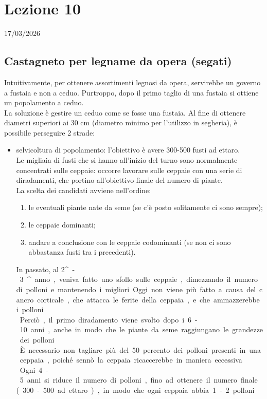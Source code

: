 \section{Lezione 10} \hfill 17/03/2026
\subsection{Castagneto per legname da opera (segati)}
Intuitivamente, per ottenere assortimenti legnosi da opera, servirebbe un governo a fustaia e non a ceduo. Purtroppo, dopo il primo taglio di una fustaia si ottiene un popolamento a ceduo.\\
La soluzione è gestire un ceduo come se fosse una fustaia. Al fine di ottenere diametri superiori ai 30 \unit{cm} (diametro minimo per l'utilizzo in segheria), è possibile perseguire 2 strade:
\begin{itemize}[nosep]
    \item selvicoltura di popolamento: l'obiettivo è avere 300-500 fusti ad ettaro.\\
    Le migliaia di fusti che si hanno all'inizio del turno sono normalmente concentrati sulle ceppaie: occorre lavorare sulle ceppaie con una serie di diradamenti, che portino all'obiettivo finale del numero di piante.\\
    La scelta dei candidati avviene nell'ordine:
    \begin{enumerate}[nosep]
        \item le eventuali piante nate da seme (se c'è posto solitamente ci sono sempre);
        \item le ceppaie dominanti;
        \item andare a conclusione con le ceppaie codominanti (se non ci sono abbastanza fusti tra i precedenti).
    \end{enumerate}
    In passato, al 2\unit{^\circ}-3\unit{^\circ} anno, veniva fatto uno sfollo sulle ceppaie, dimezzando il numero di polloni e mantenendo i migliori. Oggi non viene più fatto a causa del cancro corticale, che attacca le ferite della ceppaia, e che ammazzerebbe i polloni.\\
    Perciò, il primo diradamento viene svolto dopo i 6-10 anni, anche in modo che le piante da seme raggiungano le grandezze dei polloni.\\
    È necessario non tagliare più del 50 percento dei polloni presenti in una ceppaia, poiché sennò la ceppaia ricaccerebbe in maniera eccessiva.\\
    Ogni 4-5 anni si riduce il numero di polloni, fino ad ottenere il numero finale (300-500 ad ettaro), in modo che ogni ceppaia abbia 1-2 polloni.\\

\end{itemize}
